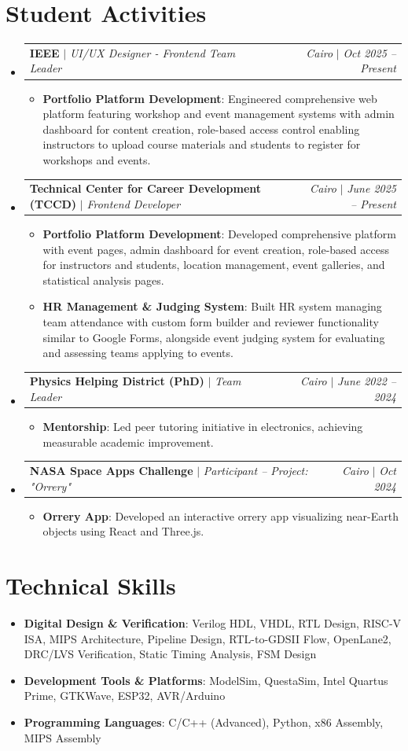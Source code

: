 \documentclass[letterpaper,11pt]{article}
\makeatletter
\newcommand{\resumeItem}[2]{\item\small{\textbf{#1}{: #2 \vspace{-2pt}}}}
\newcommand{\resumeActivitySubheading}[4]{
  \vspace{-1pt}\item
    \begin{tabular*}{0.97\textwidth}{l@{\extracolsep{\fill}}r}
      \textbf{#1} $|$ \textit{\small#3} & \textit{\small#2} $|$ \textit{\small #4} \\
    \end{tabular*}\vspace{-5pt}
}
\newcommand{\resumeSubHeadingListStart}{\begin{itemize}[leftmargin=*]}
\newcommand{\resumeSubHeadingListEnd}{\end{itemize}}
\newcommand{\resumeItemListStart}{\begin{itemize}}
\newcommand{\resumeItemListEnd}{\end{itemize}\vspace{-5pt}}
\makeatother
\begin{document}
\section{Student Activities}
  \resumeSubHeadingListStart
    \resumeActivitySubheading
      {IEEE}{Cairo}{UI/UX Designer - Frontend Team Leader}{Oct 2025 -- Present}
      \resumeItemListStart
        \resumeItem{Portfolio Platform Development}
          {Engineered comprehensive web platform featuring workshop and event management systems with admin dashboard for content creation, role-based access control enabling instructors to upload course materials and students to register for workshops and events.}
      \resumeItemListEnd
    \vspace{4pt}
    \resumeActivitySubheading
      {Technical Center for Career Development (TCCD)}{Cairo}{Frontend Developer}{June 2025 -- Present}
      \resumeItemListStart
        \resumeItem{Portfolio Platform Development}
          {Developed comprehensive platform with event pages, admin dashboard for event creation, role-based access for instructors and students, location management, event galleries, and statistical analysis pages.}
        \resumeItem{HR Management \& Judging System}
          {Built HR system managing team attendance with custom form builder and reviewer functionality similar to Google Forms, alongside event judging system for evaluating and assessing teams applying to events.}
      \resumeItemListEnd
    \vspace{4pt}
    \resumeActivitySubheading
      {Physics Helping District (PhD)}{Cairo}{Team Leader}{June 2022 -- 2024}
      \resumeItemListStart
        \resumeItem{Mentorship}
          {Led peer tutoring initiative in electronics, achieving measurable academic improvement.}
      \resumeItemListEnd
    \vspace{4pt}
    \resumeActivitySubheading
      {NASA Space Apps Challenge}{Cairo}{Participant -- Project: "Orrery"}{Oct 2024}
      \resumeItemListStart
        \resumeItem{Orrery App}
          {Developed an interactive orrery app visualizing near-Earth objects using React and Three.js.}
      \resumeItemListEnd
  \resumeSubHeadingListEnd
\section{Technical Skills}
 \resumeSubHeadingListStart
    \item{\textbf{Digital Design \& Verification}{: Verilog HDL, VHDL, RTL Design, RISC-V ISA, MIPS Architecture, Pipeline Design, RTL-to-GDSII Flow, OpenLane2, DRC/LVS Verification, Static Timing Analysis, FSM Design}}
    \item{\textbf{Development Tools \& Platforms}{: ModelSim, QuestaSim, Intel Quartus Prime, GTKWave, ESP32, AVR/Arduino}}
    \item{\textbf{Programming Languages}{: C/C++ (Advanced), Python, x86 Assembly, MIPS Assembly}}
 \resumeSubHeadingListEnd
\end{document}
